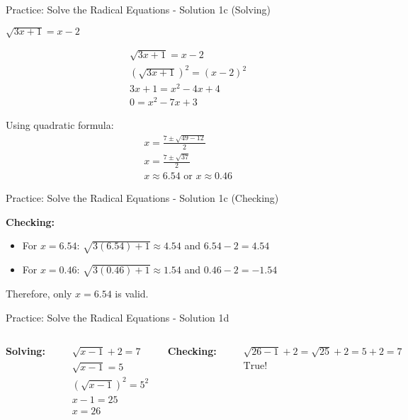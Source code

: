 \documentclass[aspectratio=169]{beamer}
\begin{document}
\begin{frame}{Practice: Solve the Radical Equations - Solution 1c (Solving)}
\begin{tcolorbox}[colback=lightgray,colframe=primary,title=Solution 1c -- Solving]
\footnotesize
$\sqrt{3x+1} = x-2$

\begin{align*}
  &\sqrt{3x+1} = x-2 \\
  &(\sqrt{3x+1})^2 = (x-2)^2 \\
  &3x+1 = x^2-4x+4 \\
  &0 = x^2-7x+3
\end{align*}

Using quadratic formula:
\begin{align*}
  &x = \frac{7 \pm \sqrt{49-12}}{2} \\
  &x = \frac{7 \pm \sqrt{37}}{2} \\
  &x \approx 6.54 \text{ or } x \approx 0.46
\end{align*}
\end{tcolorbox}
\end{frame}

\begin{frame}{Practice: Solve the Radical Equations - Solution 1c (Checking)}
\begin{tcolorbox}[colback=lightgray,colframe=primary,title=Solution 1c -- Checking]
\footnotesize
\textbf{Checking:}

\begin{itemize}
  \item For $x = 6.54$: $\sqrt{3(6.54)+1} \approx 4.54$ and $6.54-2 = 4.54$ \checkmark
  \item For $x = 0.46$: $\sqrt{3(0.46)+1} \approx 1.54$ and $0.46-2 = -1.54$ \texttimes
\end{itemize}
Therefore, only $x = 6.54$ is valid.
\end{tcolorbox}
\end{frame}

\begin{frame}{Practice: Solve the Radical Equations - Solution 1d}
\begin{tcolorbox}[colback=lightgray,colframe=primary,title=Solution 1d]
\footnotesize
\begin{columns}[T]
\textbf{Solving:}

\begin{align*}
  &\sqrt{x-1} + 2 = 7 \\
  &\sqrt{x-1} = 5 \\
  &(\sqrt{x-1})^2 = 5^2 \\
  &x-1 = 25 \\
  &x = 26
\end{align*}

\textbf{Checking:}

\begin{align*}
  &\sqrt{26-1} + 2 = \sqrt{25} + 2 = 5 + 2 = 7 \\
  &\text{True!}
\end{align*}
\end{columns}
\end{tcolorbox}
\end{frame}
\end{document}
